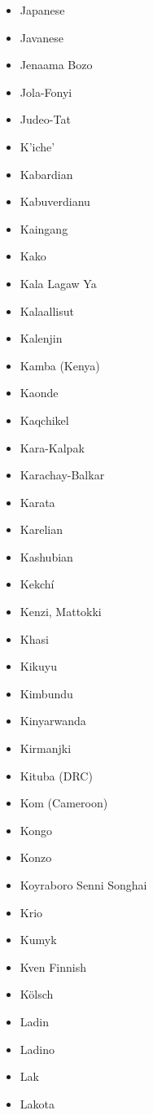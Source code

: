 \documentclass[paper=a4, 10pt]{scrbook}
\begin{document}
\begin{multicols}{3}
\begin{itemize}
        \item Japanese
        \item Javanese
        \item Jenaama Bozo
        \item Jola-Fonyi
        \item Judeo-Tat
        \item K’iche’
        \item Kabardian
        \item Kabuverdianu
        \item Kaingang
        \item Kako
        \item Kala Lagaw Ya
        \item Kalaallisut
        \item Kalenjin
        \item Kamba (Kenya)
        \item Kaonde
        \item Kaqchikel
        \item Kara-Kalpak
        \item Karachay-Balkar
        \item Karata
        \item Karelian
        \item Kashubian
        \item Kekchí
        \item Kenzi, Mattokki
        \item Khasi
        \item Kikuyu
        \item Kimbundu
        \item Kinyarwanda
        \item Kirmanjki
        \item Kituba (DRC)
        \item Kom (Cameroon)
        \item Kongo
        \item Konzo
        \item Koyraboro Senni Songhai
        \item Krio
        \item Kumyk
        \item Kven Finnish
        \item Kölsch
        \item Ladin
        \item Ladino
        \item Lak
        \item Lakota

\end{itemize}
\end{multicols}
\end{document}
